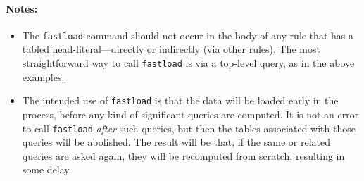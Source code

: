 \paragraph{Notes:}
\begin{itemize}
\item  The \texttt{fastload} command should not occur in the body of any
  rule that has a tabled head-literal---directly or indirectly (via other
  rules). The most straightforward way to call \texttt{fastload} is via a
  top-level query, as in the above examples. 
\item The intended use of \texttt{fastload} is that the data will be loaded
  early in the process, before any kind of significant queries are
  computed. It is not an error to call \texttt{fastload} \emph{after} such
  queries, but then the tables associated with those
  queries will be abolished. The result will be that, if the same or related
  queries are asked again, they will be recomputed from scratch,
  resulting in some delay. 
\end{itemize}


